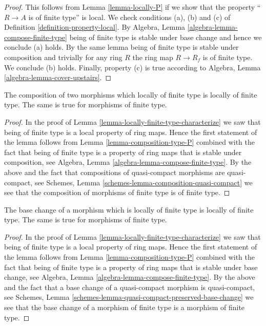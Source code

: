 \begin{proof}
This follows from Lemma \ref{lemma-locally-P} if we show that
the property ``$R \to A$ is of finite type'' is local.
We check conditions (a), (b) and (c) of Definition
\ref{definition-property-local}.
By Algebra, Lemma \ref{algebra-lemma-compose-finite-type}
being of finite type is stable under base change and hence
we conclude (a) holds. By the same lemma being of finite type
is stable under composition and trivially for any ring
$R$ the ring map $R \to R_f$ is of finite type.
We conclude (b) holds. Finally, property (c) is true
according to Algebra, Lemma \ref{algebra-lemma-cover-upstairs}.
\end{proof}

\begin{lemma}
\label{lemma-composition-finite-type}
The composition of two morphisms which locally of finite type is
locally of finite type. The same is true for morphisms of finite type.
\end{lemma}

\begin{proof}
In the proof of Lemma \ref{lemma-locally-finite-type-characterize}
we saw that being of finite type is a local property of ring maps.
Hence the first statement of the lemma follows from
Lemma \ref{lemma-composition-type-P} combined
with the fact that being of finite type is a property of ring maps that is
stable under composition, see
Algebra, Lemma \ref{algebra-lemma-compose-finite-type}.
By the above and the fact that compositions of
quasi-compact morphisms are quasi-compact, see
Schemes, Lemma \ref{schemes-lemma-composition-quasi-compact}
we see that the composition of morphisms of finite type is
of finite type.
\end{proof}

\begin{lemma}
\label{lemma-base-change-finite-type}
The base change of a morphism which is locally of finite type
is locally of finite type. The same is true for morphisms of
finite type.
\end{lemma}

\begin{proof}
In the proof of Lemma \ref{lemma-locally-finite-type-characterize}
we saw that being of finite type is a local property of ring maps.
Hence the first statement of the lemma follows from
Lemma \ref{lemma-composition-type-P} combined
with the fact that being of finite type is a property of ring maps that is
stable under base change, see
Algebra, Lemma \ref{algebra-lemma-compose-finite-type}.
By the above and the fact that a base change of a
quasi-compact morphism is quasi-compact, see
Schemes, Lemma \ref{schemes-lemma-quasi-compact-preserved-base-change}
we see that the base change of a morphism of finite type is
a morphism of finite type.
\end{proof}

